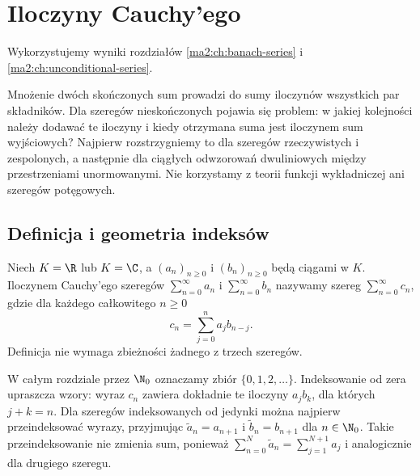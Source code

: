 \chapter{Iloczyny Cauchy'ego}
\label{ma1:ch:cauchy-product}
\noindent Wykorzystujemy wyniki rozdziałów
\ref{ma2:ch:banach-series} i \ref{ma2:ch:unconditional-series}.

Mnożenie dwóch skończonych sum prowadzi do sumy iloczynów wszystkich par składników. Dla szeregów nieskończonych pojawia się problem: w jakiej kolejności należy dodawać te iloczyny i kiedy otrzymana suma jest iloczynem sum wyjściowych? Najpierw rozstrzygniemy to dla szeregów rzeczywistych i zespolonych, a następnie dla ciągłych odwzorowań dwuliniowych między przestrzeniami unormowanymi. Nie korzystamy z teorii funkcji wykładniczej ani szeregów potęgowych.

\section{Definicja i geometria indeksów}
\begin{definicja}
\label{ma1:def:cauchy-product}
Niech $K=\R$ lub $K=\C$, a $(a_n)_{n\ge0}$ i $(b_n)_{n\ge0}$ będą ciągami w $K$. Iloczynem Cauchy'ego szeregów $\sum_{n=0}^\infty a_n$ i $\sum_{n=0}^\infty b_n$ nazywamy szereg $\sum_{n=0}^\infty c_n$, gdzie dla każdego całkowitego $n\ge0$
\[
 c_n=\sum_{j=0}^n a_jb_{n-j}.
\]
Definicja nie wymaga zbieżności żadnego z trzech szeregów.
\end{definicja}
W całym rozdziale przez $\N_0$ oznaczamy zbiór $\{0,1,2,\ldots\}$. Indeksowanie od zera upraszcza wzory: wyraz $c_n$ zawiera dokładnie te iloczyny $a_jb_k$, dla których $j+k=n$. Dla szeregów indeksowanych od jedynki można najpierw przeindeksować wyrazy, przyjmując $\widetilde a_n=a_{n+1}$ i $\widetilde b_n=b_{n+1}$ dla $n\in\N_0$. Takie przeindeksowanie nie zmienia sum, ponieważ $\sum_{n=0}^N\widetilde a_n=\sum_{j=1}^{N+1}a_j$ i analogicznie dla drugiego szeregu.

